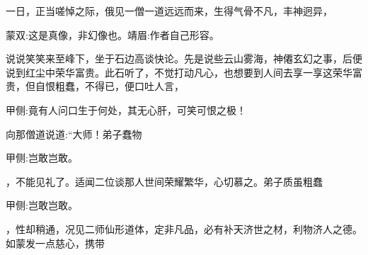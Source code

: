 \begin{parag}
    一日，正当嗟悼之际，俄见一僧一道远远而来，生得气骨不凡，丰神迥异，\begin{note}蒙双:这是真像，非幻像也。靖眉:作者自己形容。\end{note}说说笑笑来至峰下，坐于石边高谈快论。先是说些云山雾海，神僊玄幻之事，后便说到红尘中荣华富贵。此石听了，不觉打动凡心，也想要到人间去享一享这荣华富贵，但自恨粗蠢，不得已，便口吐人言，\begin{note}甲侧:竟有人问口生于何处，其无心肝，可笑可恨之极！\end{note}向那僧道说道:“大师！弟子蠢物\begin{note}甲侧:岂敢岂敢。\end{note}，不能见礼了。适闻二位谈那人世间荣耀繁华，心切慕之。弟子质虽粗蠢\begin{note}甲侧:岂敢岂敢。\end{note}，性却稍通，况见二师仙形道体，定非凡品，必有补天济世之材，利物济人之德。如蒙发一点慈心，携带
\end{parag}
